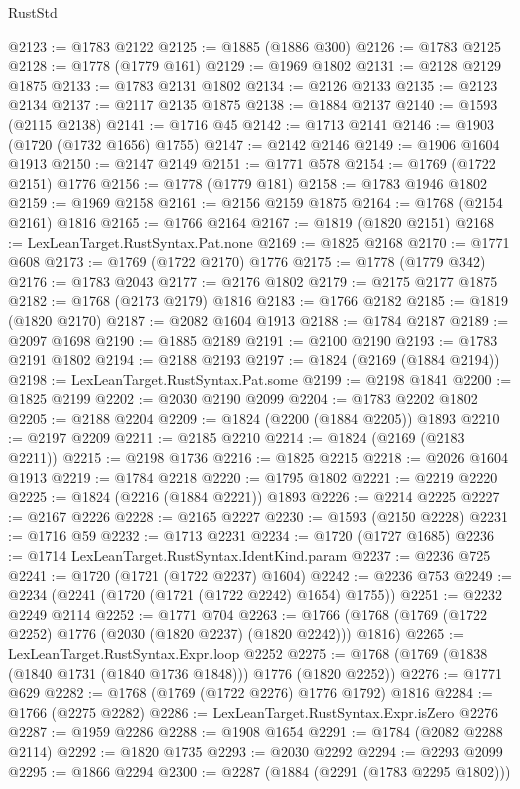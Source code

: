 \begin{lexlean}{RustStd}
\begin{coremodule}
@2123 := @1783 @2122
@2125 := @1885 (@1886 @300)
@2126 := @1783 @2125
@2128 := @1778 (@1779 @161)
@2129 := @1969 @1802
@2131 := @2128 @2129 @1875
@2133 := @1783 @2131 @1802
@2134 := @2126 @2133
@2135 := @2123 @2134
@2137 := @2117 @2135 @1875
@2138 := @1884 @2137
@2140 := @1593 (@2115 @2138)
@2141 := @1716 @45
@2142 := @1713 @2141
@2146 := @1903 (@1720 (@1732 @1656) @1755)
@2147 := @2142 @2146
@2149 := @1906 @1604 @1913
@2150 := @2147 @2149
@2151 := @1771 @578
@2154 := @1769 (@1722 @2151) @1776
@2156 := @1778 (@1779 @181)
@2158 := @1783 @1946 @1802
@2159 := @1969 @2158
@2161 := @2156 @2159 @1875
@2164 := @1768 (@2154 @2161) @1816
@2165 := @1766 @2164
@2167 := @1819 (@1820 @2151)
@2168 := LexLeanTarget.RustSyntax.Pat.none
@2169 := @1825 @2168
@2170 := @1771 @608
@2173 := @1769 (@1722 @2170) @1776
@2175 := @1778 (@1779 @342)
@2176 := @1783 @2043
@2177 := @2176 @1802
@2179 := @2175 @2177 @1875
@2182 := @1768 (@2173 @2179) @1816
@2183 := @1766 @2182
@2185 := @1819 (@1820 @2170)
@2187 := @2082 @1604 @1913
@2188 := @1784 @2187
@2189 := @2097 @1698
@2190 := @1885 @2189
@2191 := @2100 @2190
@2193 := @1783 @2191 @1802
@2194 := @2188 @2193
@2197 := @1824 (@2169 (@1884 @2194))
@2198 := LexLeanTarget.RustSyntax.Pat.some
@2199 := @2198 @1841
@2200 := @1825 @2199
@2202 := @2030 @2190 @2099
@2204 := @1783 @2202 @1802
@2205 := @2188 @2204
@2209 := @1824 (@2200 (@1884 @2205)) @1893
@2210 := @2197 @2209
@2211 := @2185 @2210
@2214 := @1824 (@2169 (@2183 @2211))
@2215 := @2198 @1736
@2216 := @1825 @2215
@2218 := @2026 @1604 @1913
@2219 := @1784 @2218
@2220 := @1795 @1802
@2221 := @2219 @2220
@2225 := @1824 (@2216 (@1884 @2221)) @1893
@2226 := @2214 @2225
@2227 := @2167 @2226
@2228 := @2165 @2227
@2230 := @1593 (@2150 @2228)
@2231 := @1716 @59
@2232 := @1713 @2231
@2234 := @1720 (@1727 @1685)
@2236 := @1714 LexLeanTarget.RustSyntax.IdentKind.param
@2237 := @2236 @725
@2241 := @1720 (@1721 (@1722 @2237) @1604)
@2242 := @2236 @753
@2249 := @2234 (@2241 (@1720 (@1721 (@1722 @2242) @1654) @1755))
@2251 := @2232 @2249 @2114
@2252 := @1771 @704
@2263 := @1766 (@1768 (@1769 (@1722 @2252) @1776 (@2030 (@1820 @2237) (@1820 @2242))) @1816)
@2265 := LexLeanTarget.RustSyntax.Expr.loop @2252
@2275 := @1768 (@1769 (@1838 (@1840 @1731 (@1840 @1736 @1848))) @1776 (@1820 @2252))
@2276 := @1771 @629
@2282 := @1768 (@1769 (@1722 @2276) @1776 @1792) @1816
@2284 := @1766 (@2275 @2282)
@2286 := LexLeanTarget.RustSyntax.Expr.isZero @2276
@2287 := @1959 @2286
@2288 := @1908 @1654
@2291 := @1784 (@2082 @2288 @2114)
@2292 := @1820 @1735
@2293 := @2030 @2292
@2294 := @2293 @2099
@2295 := @1866 @2294
@2300 := @2287 (@1884 (@2291 (@1783 @2295 @1802)))

\end{coremodule}
\end{lexlean}
